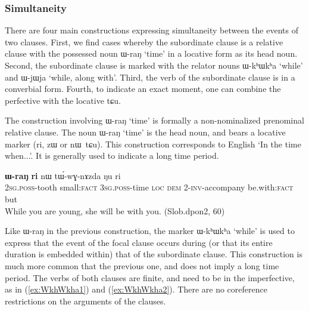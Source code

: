 \documentclass[oldfontcommands,oneside,a4paper,11pt]{article}
\newcommand{\ipa}[1]{{\phon \mbox{#1}}} %
\newcommand{\refb}[1]{(\ref{#1})}
\begin{document}
	

 

\subsubsection{Simultaneity} \label{sec:simultaneity}

There are four main constructions  expressing simultaneity between the events of two clauses. First, we find cases whereby the subordinate clause is a relative clause with the possessed noun \ipa{ɯ-raŋ} `time' in a locative form as its head noun. Second, the subordinate clause is marked with  the relator nouns \ipa{ɯ-kʰɯkʰa} `while' and \ipa{ɯ-jɯja} `while, along with'.  Third, the verb of the subordinate clause is in a converbial form. Fourth, to indicate an  exact moment, one can combine the perfective with the locative \ipa{tɕu}.


The construction involving \ipa{ɯ-raŋ} `time' is formally a non-nominalized prenominal relative clause.  The noun  \ipa{ɯ-raŋ} `time' is the head noun, and bears  a locative marker (\ipa{ri}, \ipa{zɯ} or \ipa{nɯ tɕu}). This construction corresponds to English `In the time when...'. It is generally used to indicate a long time period.

\begin{exe}
   \ex \label{ex:WraN2}
 \gll [\ipa{nɤ-ɕɣa}   	\ipa{xtɕi}]   	\textbf{\ipa{ɯ-raŋ}}   	\textbf{\ipa{ri}}   	\ipa{nɯ}   	\ipa{tɯ́-wɣ-nɤzda}   	\ipa{ŋu}   	\ipa{ri}   \\
 \textsc{2sg.poss}-tooth small:\textsc{fact} \textsc{3sg.poss}-time \textsc{loc} \textsc{dem} 2-\textsc{inv}-accompany be.with:\textsc{fact} but \\
\glt While you are young, she will be with you. (Slob.dpon2, 60)
\end{exe}

Like \ipa{ɯ-raŋ} in the previous construction, the marker  \ipa{ɯ-kʰɯkʰa} `while'  is used to express  that the event of the focal clause occurs during (or that its entire duration is embedded within) that of the subordinate clause. This construction is much more common that the previous one, and does not imply a long time period.  The verbs of both clauses are finite, and need to be in the imperfective, as in \refb{ex:WkhWkha1} and \refb{ex:WkhWkha2}. There are no coreference restrictions on the arguments of the clauses.
\end{document}
